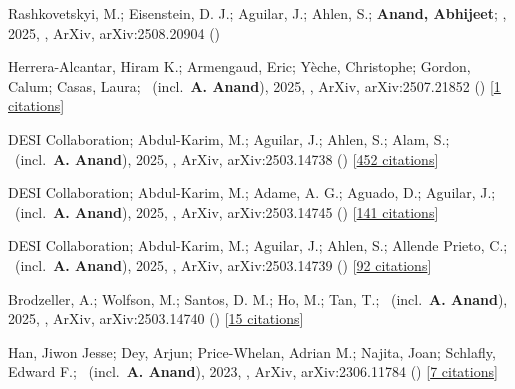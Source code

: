 \item[{\color{numcolor}\scriptsize7}] Rashkovetskyi, M.; Eisenstein, D. J.; Aguilar, J.; Ahlen, S.; \textbf{Anand, Abhijeet}; \etal, 2025, , ArXiv, arXiv:2508.20904 ()

\item[{\color{numcolor}\scriptsize6}] Herrera-Alcantar, Hiram K.; Armengaud, Eric; Y{\`e}che, Christophe; Gordon, Calum; Casas, Laura; \etal\ (incl.\ \textbf{A. Anand}), 2025, , ArXiv, arXiv:2507.21852 () [\href{https://ui.adsabs.harvard.edu/abs/2025arXiv250721852H}{1 citations}]

\item[{\color{numcolor}\scriptsize5}] DESI Collaboration; Abdul-Karim, M.; Aguilar, J.; Ahlen, S.; Alam, S.; \etal\ (incl.\ \textbf{A. Anand}), 2025, , ArXiv, arXiv:2503.14738 () [\href{https://ui.adsabs.harvard.edu/abs/2025arXiv250314738D}{452 citations}]

\item[{\color{numcolor}\scriptsize4}] DESI Collaboration; Abdul-Karim, M.; Adame, A. G.; Aguado, D.; Aguilar, J.; \etal\ (incl.\ \textbf{A. Anand}), 2025, , ArXiv, arXiv:2503.14745 () [\href{https://ui.adsabs.harvard.edu/abs/2025arXiv250314745D}{141 citations}]

\item[{\color{numcolor}\scriptsize3}] DESI Collaboration; Abdul-Karim, M.; Aguilar, J.; Ahlen, S.; Allende Prieto, C.; \etal\ (incl.\ \textbf{A. Anand}), 2025, , ArXiv, arXiv:2503.14739 () [\href{https://ui.adsabs.harvard.edu/abs/2025arXiv250314739D}{92 citations}]

\item[{\color{numcolor}\scriptsize2}] Brodzeller, A.; Wolfson, M.; Santos, D. M.; Ho, M.; Tan, T.; \etal\ (incl.\ \textbf{A. Anand}), 2025, , ArXiv, arXiv:2503.14740 () [\href{https://ui.adsabs.harvard.edu/abs/2025arXiv250314740B}{15 citations}]

\item[{\color{numcolor}\scriptsize1}] Han, Jiwon Jesse; Dey, Arjun; Price-Whelan, Adrian M.; Najita, Joan; Schlafly, Edward F.; \etal\ (incl.\ \textbf{A. Anand}), 2023, , ArXiv, arXiv:2306.11784 () [\href{https://ui.adsabs.harvard.edu/abs/2023arXiv230611784H}{7 citations}]